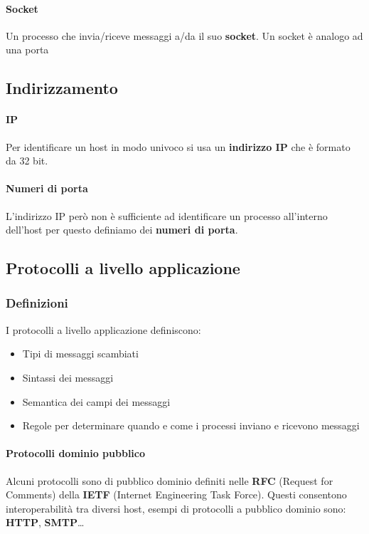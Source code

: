             \paragraph{Socket} Un processo che invia/riceve messaggi a/da il suo \textbf{socket}.\newline
            Un socket è analogo ad una porta 

    \subsection{Indirizzamento}
        \paragraph{IP} Per identificare un host in modo univoco si usa un \textbf{indirizzo IP} che è formato da 32 bit. 

        \paragraph{Numeri di porta} L'indirizzo IP però non è sufficiente ad identificare un processo all'interno dell'host per questo definiamo dei \textbf{numeri di porta}.

    \subsection{Protocolli a livello applicazione}
        \subsubsection{Definizioni}
            I protocolli a livello applicazione definiscono:
                \begin{itemize}
                    \item Tipi di messaggi scambiati
                    \item Sintassi dei messaggi
                    \item Semantica dei campi dei messaggi
                    \item Regole per determinare quando e come i processi inviano e ricevono messaggi
                \end{itemize}
            \paragraph{Protocolli dominio pubblico}Alcuni protocolli sono di pubblico dominio definiti nelle \textbf{RFC} (Request for Comments) della \textbf{IETF} (Internet Engineering Task Force). Questi consentono interoperabilità tra diversi host, esempi di protocolli a pubblico dominio sono: \textbf{HTTP}, \textbf{SMTP}\dots
